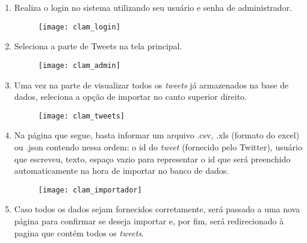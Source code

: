 \begin{enumerate}
	\item Realiza o login no sistema utilizando seu usuário e senha de administrador.
	\begin{figure}[H]
		\texttt{[image: clam\_login]}
	\end{figure}
	\item Seleciona a parte de Tweets na tela principal.
	\begin{figure}[H]
		\texttt{[image: clam\_admin]}
	\end{figure}
	\item Uma vez na parte de visualizar todos os \textit{tweets} já armazenados na base de dados,
	seleciona a opção de importar no canto superior direito.
	\begin{figure}[H]
		\texttt{[image: clam\_tweets]}
	\end{figure}
	\item Na página que segue, basta informar um arquivo .csv, .xls (formato do excel) ou .json
	contendo nessa ordem: o id do \textit{tweet} (fornecido pelo Twitter), usuário que escreveu, 
	texto, espaço vazio para representar o id que será preenchido automaticamente na hora de 
	importar no banco de dados.
	\begin{figure}[H]
		\texttt{[image: clam\_importador]}
	\end{figure}
	\item Caso todos os dados sejam fornecidos corretamente, será passado a uma nova página para
	confirmar se deseja importar e, por fim, será redirecionado à pagina que contém todos os
	\textit{tweets}.
\end{enumerate}

